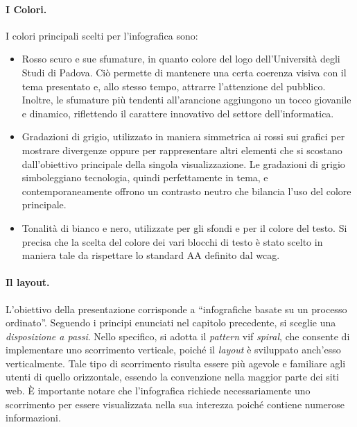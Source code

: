 \paragraph{I Colori.} I colori principali scelti per l'infografica sono:
\begin{itemize}
    \item Rosso scuro e sue sfumature, in quanto colore del logo dell'Università degli Studi di Padova. Ciò permette di mantenere una certa coerenza visiva con il
    tema presentato e, allo stesso tempo, attrarre l'attenzione del pubblico. Inoltre, le sfumature più tendenti all'arancione aggiungono un tocco giovanile e dinamico,
    riflettendo il carattere innovativo del settore dell'informatica.
    \item Gradazioni di grigio, utilizzato in maniera simmetrica ai rossi sui grafici per mostrare divergenze oppure per rappresentare altri elementi che si scostano 
    dall'obiettivo principale della singola visualizzazione. 
    Le gradazioni di grigio simboleggiano tecnologia, quindi perfettamente in tema, e contemporaneamente offrono un contrasto neutro che bilancia l'uso del colore 
    principale.
    \item Tonalità di bianco e nero, utilizzate per gli sfondi e per il colore del testo. 
    Si precisa che la scelta del colore dei vari blocchi di testo è stato scelto in maniera tale da rispettare lo standard AA definito dal \gls{wcag}.
\end{itemize}

\paragraph{Il layout.}
L'obiettivo della presentazione corrisponde a ``infografiche basate su un processo ordinato''. Seguendo i principi enunciati nel capitolo precedente, si sceglie una \emph{disposizione 
a passi}. Nello specifico, si adotta il \emph{pattern} \gls{vif} \emph{spiral}, che consente di implementare uno scorrimento verticale, poiché il \emph{layout} è sviluppato anch'esso verticalmente.  
Tale tipo di scorrimento risulta essere più agevole e familiare agli utenti di quello orizzontale, essendo la convenzione nella maggior parte dei siti web. 
È importante notare che l'infografica richiede necessariamente uno scorrimento per essere visualizzata nella sua interezza poiché contiene numerose informazioni.

